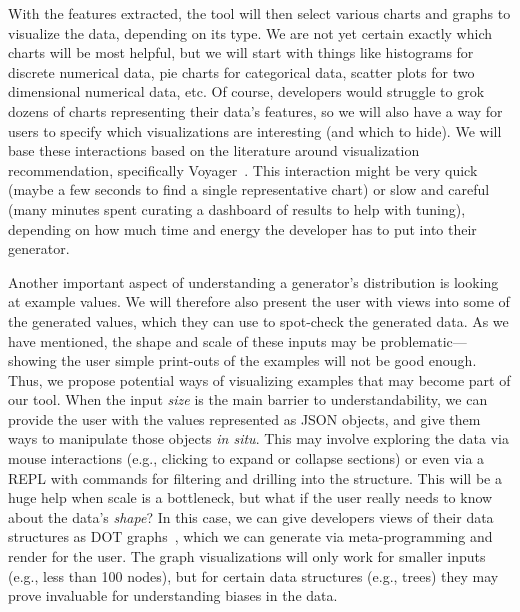 
With the features extracted, the tool will then select various charts and
graphs to visualize the data, depending on its type. We are not yet certain
exactly which charts will be most helpful, but we will start with things like
histograms for discrete numerical data, pie charts for categorical data, scatter
plots for two dimensional numerical data, etc.  Of course, developers would
struggle to grok dozens of charts representing their data's features, so
we will also have a way for users to specify which visualizations are
interesting (and which to hide). We will base these interactions based on the
literature around visualization recommendation, specifically
Voyager~\cite{}. This
interaction might be very quick (maybe a few seconds to find a single
representative chart) or slow and careful (many minutes spent curating a
dashboard of results to help with tuning), depending on how much time and energy
the developer has to put into their generator.

Another important aspect of understanding a generator's distribution is looking
at example values. We will therefore also present the user with views into some
of the generated values, which they can use to spot-check the generated data. As
we have mentioned, the shape and scale of these inputs may be
problematic---showing the user simple print-outs of the examples will not be
good enough. Thus, we propose potential ways of visualizing examples that may
become part of our tool.
When the input {\em size} is the main barrier to understandability, we can
provide the user with the values represented as JSON objects, and give them ways
to manipulate those objects {\em in situ}.  This may involve exploring the data
via mouse interactions (e.g., clicking to expand or collapse sections) or even
via a REPL with commands for filtering and drilling into the structure. This
will be a huge help when scale is a bottleneck, but what if the user really
needs to know about the data's {\em shape}?
In this case, we can give developers views of their data structures as DOT
graphs~\cite{ellson_graphviz_2002}, which we can generate via
meta-programming and render for the user. The graph visualizations will only
work for smaller inputs (e.g., less than 100 nodes), but for certain data
structures (e.g., trees) they may prove invaluable for understanding biases in
the data.

